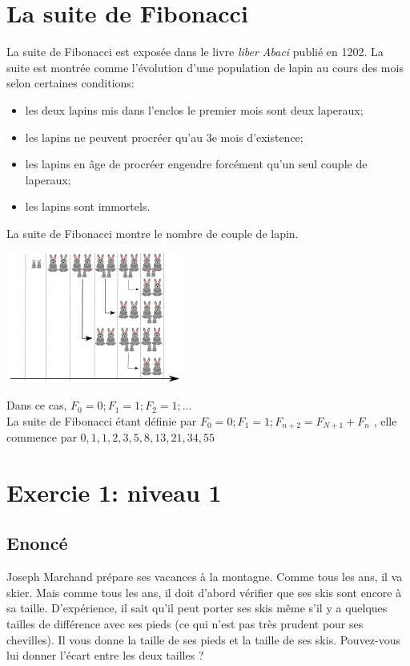 \documentclass{article}
\begin{document}
    \section{La suite de Fibonacci}
        La suite de Fibonacci est exposée dans le livre \textit{liber Abaci} publié en 1202. La suite est montrée comme l'évolution
        d'une population de lapin au cours des mois selon certaines conditions:
        \begin{itemize}
            \item les deux lapins mis dans l'enclos le premier mois sont deux laperaux;
            \item les lapins ne peuvent procréer qu'au 3e mois d'existence;
            \item les lapins en âge de procréer engendre forcément qu'un seul couple de laperaux;
            \item les lapins sont immortels.
        \end{itemize}
        La suite de Fibonacci montre le nombre de couple de lapin.
        \begin{center}
            \includegraphics{images/Fibonacci_lapins.png}
        \end{center}
        Dans ce cas, $F_0 = 0; F_1 = 1; F_2 = 1 ;\dots$ \\
        La suite de Fibonacci étant définie par $F_0 = 0; F_1 = 1; F_{n+2} = F_{N+1} + F_n $
        , elle commence par $0, 1, 1, 2, 3, 5, 8, 13, 21, 34, 55$

        \newpage

    \section{Exercie 1: niveau 1}
        \subsection{Enoncé}
            Joseph Marchand prépare ses vacances à la montagne. Comme tous les ans, il va skier. Mais comme tous
            les ans, il doit d’abord vérifier que ses skis sont encore à sa taille.
            D’expérience, il sait qu’il peut porter ses skis même s’il y a quelques tailles de différence avec ses pieds
            (ce qui n’est pas très prudent pour ses chevilles).
            Il vous donne la taille de ses pieds et la taille de ses skis. Pouvez-vous lui donner l’écart entre les deux
            tailles ?
\end{document}

